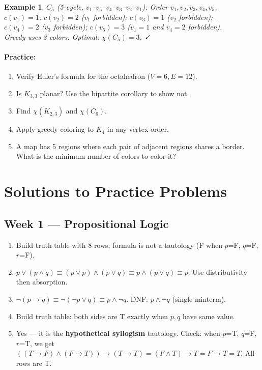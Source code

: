 \documentclass[11pt]{article}
\newtheorem{example}[definition]{Example}
\newenvironment{practice}{\paragraph*{\textbf{Practice:}}}{}
\newcommand{\ra}{\rightarrow}
\begin{document}
\begin{example}
$C_5$ (5-cycle, $v_1$–$v_5$–$v_4$–$v_3$–$v_2$–$v_1$):
Order $v_1,v_2,v_3,v_4,v_5$.\\
$c(v_1)=1$; $c(v_2)=2$ ($v_1$ forbidden); $c(v_3)=1$ ($v_2$ forbidden);\\
$c(v_4)=2$ ($v_3$ forbidden); $c(v_5)=3$ ($v_1=1$ and $v_4=2$ forbidden).\\
Greedy uses 3 colors. Optimal: $\chi(C_5)=3$. ✓
\end{example}

\begin{practice}
\begin{enumerate}[nosep,label=\arabic*.]
  \item Verify Euler's formula for the octahedron ($V=6,E=12$).
  \item Is $K_{3,3}$ planar? Use the bipartite corollary to show not.
  \item Find $\chi(K_{2,3})$ and $\chi(C_6)$.
  \item Apply greedy coloring to $K_4$ in any vertex order.
  \item A map has 5 regions where each pair of adjacent regions shares a border. What is the minimum number of colors to color it?
\end{enumerate}
\end{practice}

\newpage
\section*{Solutions to Practice Problems}

\subsection*{Week 1 — Propositional Logic}
\begin{enumerate}[nosep,label=\arabic*.]
  \item Build truth table with 8 rows; formula is not a tautology (F when $p$=F, $q$=F, $r$=F).
  \item $p\lor(p\land q)\equiv (p\lor p)\land(p\lor q)\equiv p\land(p\lor q)\equiv p$. Use distributivity then absorption.
  \item $\neg(p\ra q)\equiv\neg(\neg p\lor q)\equiv p\land\neg q$. DNF: $p\land\neg q$ (single minterm).
  \item Build truth table: both sides are T exactly when $p,q$ have same value.
  \item Yes — it is the \textbf{hypothetical syllogism} tautology. Check: when $p$=T, $q$=F, $r$=T, we get $((T\ra F)\land(F\ra T))\ra(T\ra T)=(F\land T)\ra T=F\ra T=T$. All rows are T.
\end{enumerate}
\end{document}
